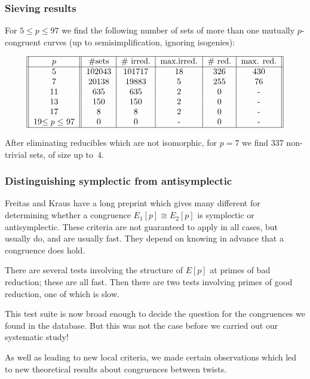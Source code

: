 \documentclass[handout]{beamer}
\newcommand{\high}[1]{\emph{\color{blue}{#1}}}
\begin{document}
\begin{frame}\frametitle{Sieving results}
  For $5\le p\le 97$ we find the following number of sets of more than
  one mutually $p$-congruent curves (up to semisimplification,
  ignoring isogenies):

  \[
  \begin{tabular}{||c||c|c|c|c|c||}
    \hline
    $p$ & \#sets & \# irred. & max.irred. & \# red. & max. red.\\
    \hline
    5 & 102043 & 101717 & 18 & 326 & 430 \\
    7 & 20138 & 19883 & 5 & 255 & 76 \\
    11 & 635 & 635 & 2 & 0 & - \\
    13 & 150 & 150 & 2 & 0 & - \\
    17 & 8 & 8 & 2 & 0 & - \\
    19$\le p\le$ 97 & 0 & 0 & - & 0 & - \\
    \hline
  \end{tabular}
  \]

After eliminating reducibles which are not isomorphic, for $p=7$ we
find $337$ non-trivial sets, of size up to~$4$.
\end{frame}

\begin{frame}\frametitle{Distinguishing symplectic from
    antisymplectic}

  Freitas and Kraus have a long preprint which gives many different
  \high{local criteria} for determining whether a congruence
  $E_1[p]\cong E_2[p]$ is symplectic or antisymplectic.  These
  criteria are not guaranteed to apply in all cases, but usually do,
  and are usually fast.  They depend on knowing in advance that a
  congruence does hold.

\pause\medskip

  There are several tests involving the structure of $E[p]$ at primes
  of bad reduction; these are all fast.  Then there are two tests
  involving primes of good reduction, one of which is slow.

\pause\medskip

  This test suite is now broad enough to decide the question for
  \high{all} the congruences we found in the database.  But this was
  not the case before we carried out our systematic study!\pause

  As well as leading to new local criteria, we made certain
  observations which led to new theoretical results about congruences
  between twists.

\end{frame}
\end{document}
